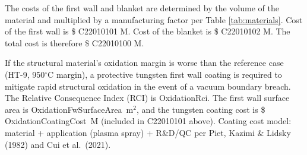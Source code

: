 The costs of the first wall and blanket are determined by the volume of the material and multiplied by a manufacturing factor per Table \ref{tab:materials}.   Cost of the first wall is \$ C22010101 M.  Cost of the blanket is \$ C22010102 M. The total cost is therefore \$ C22010100 M.

\ifsafetycosts
If the structural material's oxidation margin is worse than the reference case (HT-9, 950$^{\circ}$C margin), a protective tungsten first wall coating is required to mitigate rapid structural oxidation in the event of a vacuum boundary breach. The Relative Consequence Index (RCI) is OxidationRci. The first wall surface area is OxidationFwSurfaceArea~m$^{2}$, and the tungsten coating cost is \$ OxidationCoatingCost~M (included in C22010101 above). Coating cost model: material + application (plasma spray) + R\&D/QC per Piet, Kazimi \& Lidsky (1982) and Cui et al.\ (2021).
\fi


